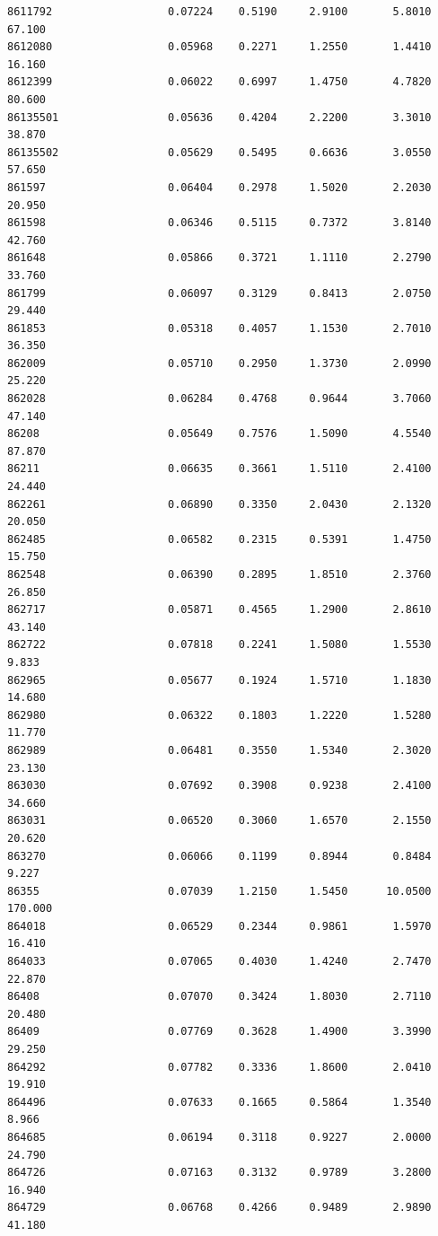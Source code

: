 \documentclass[
  letterpaper,
  DIV=11,
  numbers=noendperiod]{scrartcl}
\begin{document}
\begin{verbatim}
8611792                  0.07224    0.5190     2.9100       5.8010  67.100
8612080                  0.05968    0.2271     1.2550       1.4410  16.160
8612399                  0.06022    0.6997     1.4750       4.7820  80.600
86135501                 0.05636    0.4204     2.2200       3.3010  38.870
86135502                 0.05629    0.5495     0.6636       3.0550  57.650
861597                   0.06404    0.2978     1.5020       2.2030  20.950
861598                   0.06346    0.5115     0.7372       3.8140  42.760
861648                   0.05866    0.3721     1.1110       2.2790  33.760
861799                   0.06097    0.3129     0.8413       2.0750  29.440
861853                   0.05318    0.4057     1.1530       2.7010  36.350
862009                   0.05710    0.2950     1.3730       2.0990  25.220
862028                   0.06284    0.4768     0.9644       3.7060  47.140
86208                    0.05649    0.7576     1.5090       4.5540  87.870
86211                    0.06635    0.3661     1.5110       2.4100  24.440
862261                   0.06890    0.3350     2.0430       2.1320  20.050
862485                   0.06582    0.2315     0.5391       1.4750  15.750
862548                   0.06390    0.2895     1.8510       2.3760  26.850
862717                   0.05871    0.4565     1.2900       2.8610  43.140
862722                   0.07818    0.2241     1.5080       1.5530   9.833
862965                   0.05677    0.1924     1.5710       1.1830  14.680
862980                   0.06322    0.1803     1.2220       1.5280  11.770
862989                   0.06481    0.3550     1.5340       2.3020  23.130
863030                   0.07692    0.3908     0.9238       2.4100  34.660
863031                   0.06520    0.3060     1.6570       2.1550  20.620
863270                   0.06066    0.1199     0.8944       0.8484   9.227
86355                    0.07039    1.2150     1.5450      10.0500 170.000
864018                   0.06529    0.2344     0.9861       1.5970  16.410
864033                   0.07065    0.4030     1.4240       2.7470  22.870
86408                    0.07070    0.3424     1.8030       2.7110  20.480
86409                    0.07769    0.3628     1.4900       3.3990  29.250
864292                   0.07782    0.3336     1.8600       2.0410  19.910
864496                   0.07633    0.1665     0.5864       1.3540   8.966
864685                   0.06194    0.3118     0.9227       2.0000  24.790
864726                   0.07163    0.3132     0.9789       3.2800  16.940
864729                   0.06768    0.4266     0.9489       2.9890  41.180

\end{verbatim}
\end{document}

